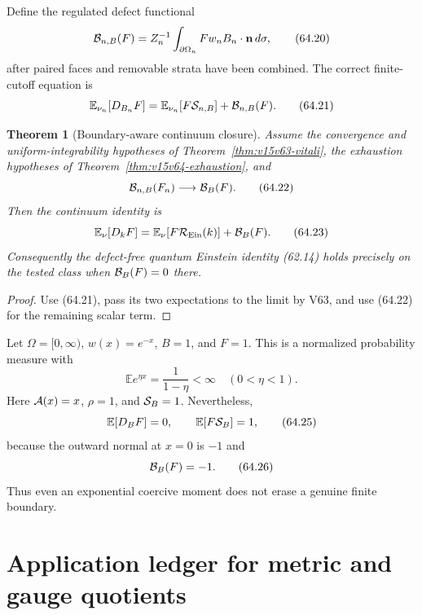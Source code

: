 \documentclass[11pt]{article}
\newtheorem{theorem}{Theorem}[section]
\theoremstyle{remark}
\begin{document}
Define the regulated defect functional
\[
 {\cal B}_{n,B}(F)
 =
 Z_n^{-1}\int_{\partial\Omega_n}
 Fw_nB_n\mathbin{\cdot}{\bf n}\,d\sigma,              \tag{64.20}
\]
after paired faces and removable strata have been combined.
The correct finite-cutoff equation is
\[
 \mathbb E_{\nu_n}[D_{B_n}F]
 =
 \mathbb E_{\nu_n}[F{\cal S}_{n,B}]
 +{\cal B}_{n,B}(F).                                  \tag{64.21}
\]

\begin{theorem}[Boundary-aware continuum closure]
\label{thm:v15v64-boundary-limit}
Assume the convergence and uniform-integrability hypotheses of
Theorem~\ref{thm:v15v63-vitali}, the exhaustion hypotheses of
Theorem~\ref{thm:v15v64-exhaustion}, and
\[
 {\cal B}_{n,B}(F_n)\longrightarrow{\cal B}_B(F).      \tag{64.22}
\]
Then the continuum identity is
\[
 \mathbb E_\nu[D_kF]
 =
 \mathbb E_\nu[F{\cal R}_{\rm Ein}(k)]
 +{\cal B}_B(F).                                      \tag{64.23}
\]
Consequently the defect-free quantum Einstein identity (62.14)
holds precisely on the tested class when
\({\cal B}_B(F)=0\) there.
\end{theorem}

\begin{proof}
Use (64.21), pass its two expectations to the limit by V63, and
use (64.22) for the remaining scalar term.
\end{proof}

\begin{counterexample}
\label{cnt:v15v64-halfline}
Let \(\Omega=[0,\infty)\), \(w(x)=e^{-x}\), \(B=1\), and
\(F=1\).  This is a normalized probability measure with
\[
 \mathbb E e^{\eta x}=\frac1{1-\eta}<\infty
 \quad(0<\eta<1).                                     \tag{64.24}
\]
Here \({\cal A}(x)=x\), \(\rho=1\), and
\({\cal S}_B=1\).  Nevertheless,
\[
 \mathbb E[D_BF]=0,\qquad
 \mathbb E[F{\cal S}_B]=1,                            \tag{64.25}
\]
because the outward normal at \(x=0\) is \(-1\) and
\[
 {\cal B}_B(F)=-1.                                    \tag{64.26}
\]
Thus even an exponential coercive moment does not erase a genuine
finite boundary.
\end{counterexample}

\section{Application ledger for metric and gauge quotients}
\end{document}
